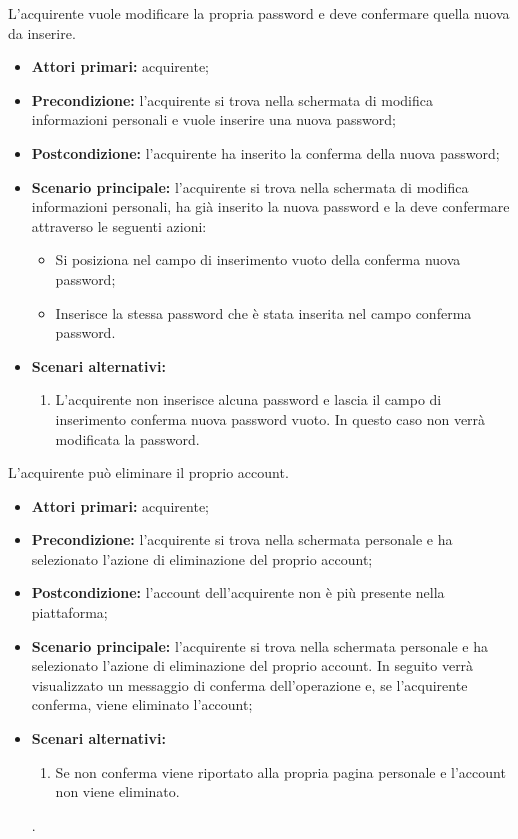 L'acquirente vuole modificare la propria password e deve confermare quella nuova da inserire.
\begin{itemize}
    \item \textbf{Attori primari:} acquirente;
    \item \textbf{Precondizione:} l'acquirente si trova nella schermata di modifica informazioni personali e vuole inserire una nuova password;
    \item \textbf{Postcondizione:} l'acquirente ha inserito la conferma della nuova password;
    \item \textbf{Scenario principale:} l'acquirente si trova nella schermata di modifica informazioni personali, ha già inserito la nuova password e la deve confermare attraverso le seguenti azioni:
    \begin{itemize}
        \item Si posiziona nel campo di inserimento vuoto della conferma nuova password;
        \item Inserisce la stessa password che è stata inserita nel campo conferma password.
    \end{itemize}
    \item \textbf{Scenari alternativi:}
    \begin{enumerate}
        \item L'acquirente non inserisce alcuna password e lascia il campo di inserimento conferma nuova password vuoto. In questo caso non verrà modificata la password.
    \end{enumerate}
\end{itemize}


L'acquirente può eliminare il proprio account.
\begin{itemize}
    \item \textbf{Attori primari:} acquirente;
    \item \textbf{Precondizione:} l'acquirente si trova nella schermata personale e ha selezionato l'azione di eliminazione del proprio account;
    \item \textbf{Postcondizione:} l'account dell'acquirente non è più presente nella piattaforma;
    \item \textbf{Scenario principale:} l'acquirente si trova nella schermata personale e ha selezionato l'azione di eliminazione del proprio account. In seguito verrà visualizzato un messaggio di conferma dell'operazione e, se l'acquirente conferma, viene eliminato l'account;
    \item \textbf{Scenari alternativi:}
    \begin{enumerate}[label=\lett]
        \item Se non conferma viene riportato alla propria pagina personale e l'account non viene eliminato.
    \end{enumerate}.
\end{itemize}
